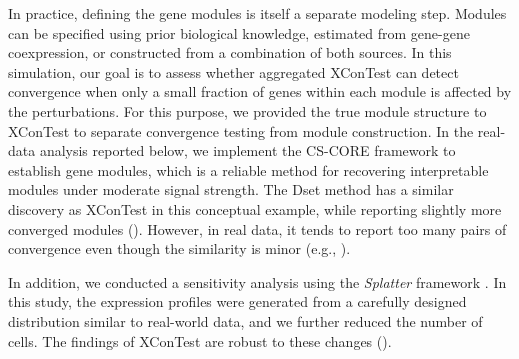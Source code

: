 \documentclass[11pt]{article}
\newenvironment{revblockr3}
  {\color[RGB]{210,110,110}}
  {}
\begin{document}
\begin{revblockr3}
In practice, defining the gene modules is itself a separate modeling step. Modules can be specified using prior biological knowledge, estimated from gene-gene coexpression, or constructed from a combination of both sources. In this simulation, our goal is to assess whether aggregated XConTest can detect convergence when only a small fraction of genes within each module is affected by the perturbations. For this purpose, we provided the true module structure to XConTest to separate convergence testing from module construction. In the real-data analysis reported below, we implement the CS-CORE framework to establish gene modules, which is a reliable method for recovering interpretable modules under moderate signal strength. The Dset method has a similar discovery as XConTest in this conceptual example, while reporting slightly more converged modules (). However, in real data, it tends to report too many pairs of convergence even though the similarity is minor (e.g., ).


In addition, we conducted a sensitivity analysis using the \textit{Splatter} framework \cite{zappia2017splatter}. In this study, the expression profiles were generated from a carefully designed distribution similar to real-world data, and we further reduced the number of cells. The findings of XConTest are robust to these changes ().

\end{revblockr3}


\end{document}
